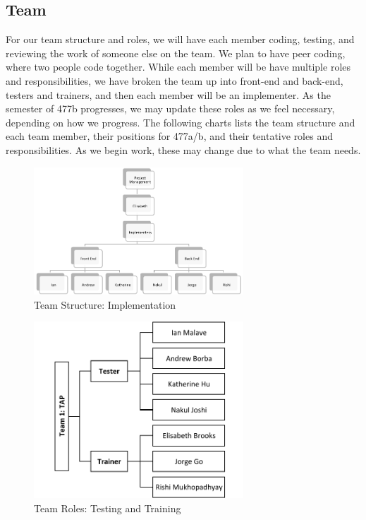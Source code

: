 \subsection{Team}
For our team structure and roles, we will have each member coding, testing, and reviewing the work of someone else on the team. We plan to have peer coding, where two people code together. While each member will be have multiple roles and responsibilities, we have broken the team up into front-end and back-end, testers and trainers, and then each member will be an implementer. As the semester of 477b progresses, we may update these roles as we feel necessary, depending on how we progress. 
The following charts lists the team structure and each team member, their positions for 477a/b, and their tentative roles and responsibilities. As we begin work, these may change due to what the team needs.

\begin{figure}[!htbp]
\centering
\includegraphics[width=0.7\textwidth]{images/implementation.pdf}
\caption{Team Structure: Implementation}
\end{figure}

\begin{figure}[!htbp]
\centering
\includegraphics[width=0.7\textwidth]{images/testingtraining.pdf}
\caption{Team Roles: Testing and Training}
\end{figure}


